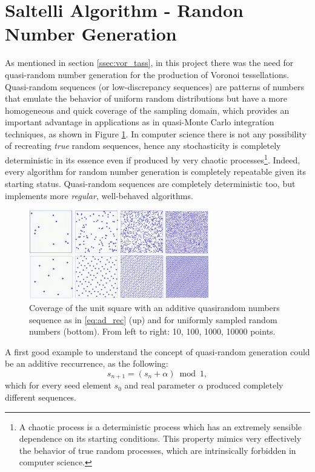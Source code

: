 \documentclass[12pt,a4paper]{report}
\begin{document}
\section{Saltelli Algorithm - Randon Number Generation} \label{ssec:saltelli}
    As mentioned in section \ref{ssec:vor_tass}, in this project there was the need for quasi-random number generation for the production of Voronoi tessellations. Quasi-random sequences (or low-discrepancy sequences) are patterns of numbers that emulate the behavior of uniform random distributions but have a more homogeneous and quick coverage of the sampling domain, which provides an important advantage in applications as in quasi-Monte Carlo integration techniques, as shown in Figure \ref{fig:Subrandom_2D}. In computer science there is not any possibility of recreating \textit{true} random sequences, hence any stochasticity is completely deterministic in its essence even if produced by very chaotic processes\footnote{A chaotic process is a deterministic process which has an extremely sensible dependence on its starting conditions. This property mimics very effectively the behavior of true random processes, which are intrinsically forbidden in computer science.}. Indeed, every algorithm for random number generation is completely repeatable given its starting status. Quasi-random sequences are completely deterministic too, but implements more \textit{regular}, well-behaved algorithms.

    \begin{figure}
        \centering
        \includegraphics[width = 0.7\textwidth]{images/Subrandom_2D}
        \caption{Coverage of the unit square with an additive quasirandom numbers sequence as in \ref{eq:ad_rec} (up) and for uniformly sampled random numbers (bottom). From left to right: 10, 100, 1000, 10000 points.}
        \label{fig:Subrandom_2D}
    \end{figure}

    A first good example to understand the concept of quasi-random generation could be an additive reccurrence, as the following:
    \begin{equation}
        s_{n+1} = ( s_n + \alpha ) \bmod 1,
        \label{eq:ad_rec}
    \end{equation}
    which for every seed element $s_0$ and real parameter $\alpha$ produced completely different sequences.
\end{document}
